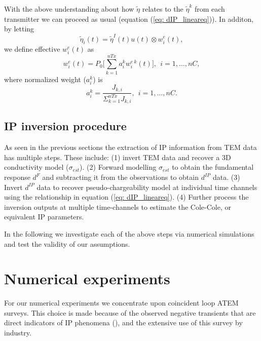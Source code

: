 \documentclass[a4paper, 11pt]{article}
\newcommand{\peta}{\tilde{\eta}}
\newcommand{\dip}{d^{IP}}
\begin{document}
With the above understanding about how $\peta$ relates to the $\peta^k$ from each transmitter we can proceed as usual (equation (\ref{eq: dIP_lineareq})). 
In additon, by letting 
\begin{equation}
  \peta_i(t) = \peta^I(t)u(t) \otimes w^e_i(t),
\end{equation}
we define effective $w^e_i(t)$ as 
\begin{equation}
  w^e_i(t)= P_0\Big[\sum_{k=1}^{nTx} a^k_i w^{e \ k}_i(t)\Big], \ \ i=1, \ldots, nC,
  \label{eq: we_eff}
\end{equation}
where normalized weight ($a^k_i$) is 
\begin{equation}
  a^k_i = \frac {J_{k,i}} {\Sigma_{k=1}^{nTx} J_{k,i}}, \ \ i=1, \ldots, nC.
  \label{eq: normalized_weights}
\end{equation}

\subsection{IP inversion procedure}
As seen in the previous sections the extraction of IP information from TEM data has multiple steps. These include: (1) invert TEM data and recover a 3D conductivity model ($\sigma_{est}$). 
(2) Forward modelling $\sigma_{est}$ to obtain the fundamental response $d^F$ and subtracting it from the observations to obtain $\dip$ data.
(3) Invert  $\dip$ data to recover pseudo-chargeability model at individual time channels using the relationship in equation (\ref{eq: dIP_lineareq}). 
(4) Further process the inversion outputs at multiple time-channels  to estimate the Cole-Cole, or equivalent IP parameters.

In the following we investigate each of the above steps via numerical simulations and test the validity of our assumptions. 


\section{Numerical experiments}
\label{section: numerical_examples}
For our numerical experiments we concentrate upon coincident loop ATEM surveys. This choice is made because of the observed negative transients that are direct indicators of IP phenomena (\cite{Kratzer2012,Kang2015a,Kang2015b,Doug2015}), and the extensive  use of this survey  by industry.  
\end{document}
